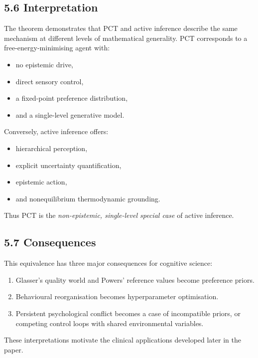 \documentclass[11pt,a4paper,twoside]{article}
\begin{document}
\subsection*{5.6 Interpretation}

The theorem demonstrates that PCT and active inference describe the same mechanism
at different levels of mathematical generality.
PCT corresponds to a free-energy-minimising agent with:

\begin{itemize}
    \item no epistemic drive,
    \item direct sensory control,
    \item a fixed-point preference distribution,
    \item and a single-level generative model.
\end{itemize}

Conversely, active inference offers:

\begin{itemize}
    \item hierarchical perception,
    \item explicit uncertainty quantification,
    \item epistemic action,
    \item and nonequilibrium thermodynamic grounding.
\end{itemize}

Thus PCT is the \emph{non-epistemic, single-level special case} of active inference.

\subsection*{5.7 Consequences}

This equivalence has three major consequences for cognitive science:

\begin{enumerate}
    \item Glasser’s quality world and Powers’ reference values become preference priors.
    \item Behavioural reorganisation becomes hyperparameter optimisation.
    \item Persistent psychological conflict becomes a case of incompatible priors,
          or competing control loops with shared environmental variables.
\end{enumerate}

These interpretations motivate the clinical applications developed later in the paper.
\end{document}
